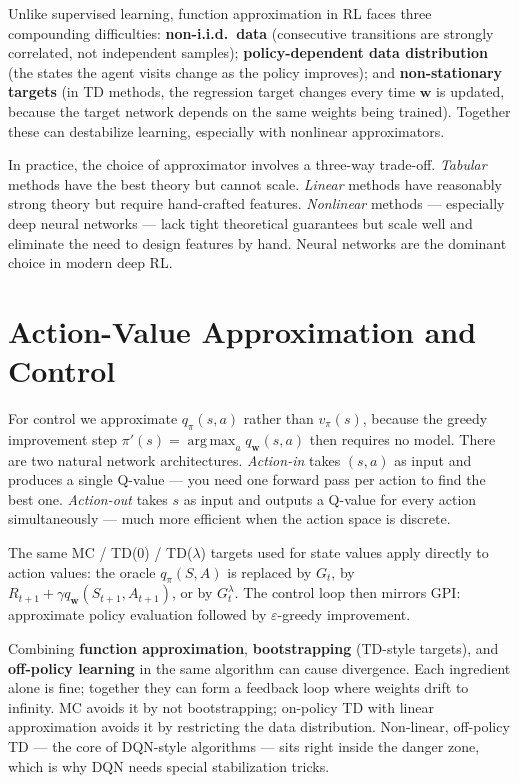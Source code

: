 \documentclass[11pt, oneside]{book}
\newcommand{\argmax}{\operatorname*{arg\,max}}
\newcommand{\vpi}{v_{\pi}}               %
\newcommand{\qpi}{q_{\pi}}               %
\begin{document}
\begin{intbox}[title={Challenges Specific to RL}]
Unlike supervised learning, function approximation in RL faces three
compounding difficulties:
\textbf{non-i.i.d.\ data} (consecutive transitions are strongly correlated,
not independent samples);
\textbf{policy-dependent data distribution} (the states the agent visits
change as the policy improves); and
\textbf{non-stationary targets} (in TD methods, the regression target changes
every time $\mathbf{w}$ is updated, because the target network depends on the
same weights being trained).
Together these can destabilize learning, especially with nonlinear approximators.
\end{intbox}

In practice, the choice of approximator involves a three-way trade-off.
\emph{Tabular} methods have the best theory but cannot scale.
\emph{Linear} methods have reasonably strong theory but require hand-crafted
features.
\emph{Nonlinear} methods --- especially deep neural networks --- lack tight
theoretical guarantees but scale well and eliminate the need to design features
by hand.
Neural networks are the dominant choice in modern deep RL.

\section{Action-Value Approximation and Control}

For control we approximate $\qpi(s,a)$ rather than $\vpi(s)$, because
the greedy improvement step $\pi'(s) = \argmax_a q_\mathbf{w}(s,a)$ then
requires no model.
There are two natural network architectures.
\emph{Action-in} takes $(s, a)$ as input and produces a single Q-value ---
you need one forward pass per action to find the best one.
\emph{Action-out} takes $s$ as input and outputs a Q-value for every action
simultaneously --- much more efficient when the action space is discrete.

The same MC / TD(0) / TD($\lambda$) targets used for state values apply
directly to action values:
the oracle $\qpi(S,A)$ is replaced by $G_t$, by
$R_{t+1} + \gamma q_\mathbf{w}(S_{t+1},A_{t+1})$, or by $G_t^\lambda$.
The control loop then mirrors GPI: approximate policy evaluation
followed by $\varepsilon$-greedy improvement.

\begin{notebox}[title={The Deadly Triad}]
Combining \textbf{function approximation}, \textbf{bootstrapping} (TD-style
targets), and \textbf{off-policy learning} in the same algorithm can cause
divergence.
Each ingredient alone is fine; together they can form a feedback loop where
weights drift to infinity.
MC avoids it by not bootstrapping; on-policy TD with linear approximation
avoids it by restricting the data distribution.
Non-linear, off-policy TD --- the core of DQN-style algorithms --- sits right
inside the danger zone, which is why DQN needs special stabilization tricks.
\end{notebox}
\end{document}
